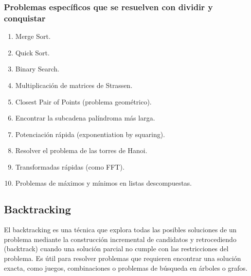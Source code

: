 \subsubsection{Problemas específicos que se resuelven con dividir y conquistar}  
\begin{enumerate}  
  \item Merge Sort.  
  \item Quick Sort.  
  \item Binary Search.  
  \item Multiplicación de matrices de Strassen.  
  \item Closest Pair of Points (problema geométrico).  
  \item Encontrar la subcadena palíndroma más larga.  
  \item Potenciación rápida (exponentiation by squaring).  
  \item Resolver el problema de las torres de Hanoi.  
  \item Transformadas rápidas (como FFT).  
  \item Problemas de máximos y mínimos en listas descompuestas.  
\end{enumerate} 

\subsection{Backtracking}  
El backtracking es una técnica que explora todas las posibles soluciones de un problema mediante la construcción incremental de candidatos y retrocediendo (backtrack) cuando una solución parcial no cumple con las restricciones del problema. Es útil para resolver problemas que requieren encontrar una solución exacta, como juegos, combinaciones o problemas de búsqueda en árboles o grafos.  

